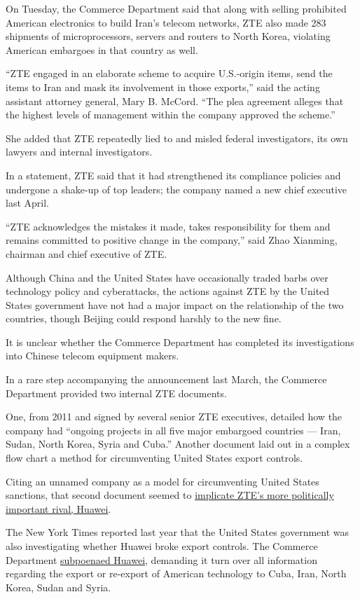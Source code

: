 On Tuesday, the Commerce Department said that along with selling
prohibited American electronics to build Iran's telecom networks, ZTE
also made 283 shipments of microprocessors, servers and routers to North
Korea, violating American embargoes in that country as well.

``ZTE engaged in an elaborate scheme to acquire U.S.-origin items, send
the items to Iran and mask its involvement in those exports,'' said the
acting assistant attorney general, Mary B. McCord. ``The plea agreement
alleges that the highest levels of management within the company
approved the scheme.''

She added that ZTE repeatedly lied to and misled federal investigators,
its own lawyers and internal investigators.

In a statement, ZTE said that it had strengthened its compliance
policies and undergone a shake-up of top leaders; the company named a
new chief executive last April.

``ZTE acknowledges the mistakes it made, takes responsibility for them
and remains committed to positive change in the company,'' said Zhao
Xianming, chairman and chief executive of ZTE.

Although China and the United States have occasionally traded barbs over
technology policy and cyberattacks, the actions against ZTE by the
United States government have not had a major impact on the relationship
of the two countries, though Beijing could respond harshly to the new
fine.

It is unclear whether the Commerce Department has completed its
investigations into Chinese telecom equipment makers.

In a rare step accompanying the announcement last March, the Commerce
Department provided two internal ZTE documents.

One, from 2011 and signed by several senior ZTE executives, detailed how
the company had ``ongoing projects in all five major embargoed countries
--- Iran, Sudan, North Korea, Syria and Cuba.'' Another document laid
out in a complex flow chart a method for circumventing United States
export controls.

Citing an unnamed company as a model for circumventing United States
sanctions, that second document seemed to
\href{https://www.nytimes.com/2016/03/19/technology/zte-document-raises-questions-about-huawei-and-sanctions.html}{implicate
ZTE's more politically important rival, Huawei}.

The New York Times reported last year that the United States government
was also investigating whether Huawei broke export controls. The
Commerce Department
\href{https://www.nytimes.com/2016/06/03/technology/huawei-technologies-subpoena-iran-north-korea.html}{subpoenaed
Huawei}, demanding it turn over all information regarding the export or
re-export of American technology to Cuba, Iran, North Korea, Sudan and
Syria.

